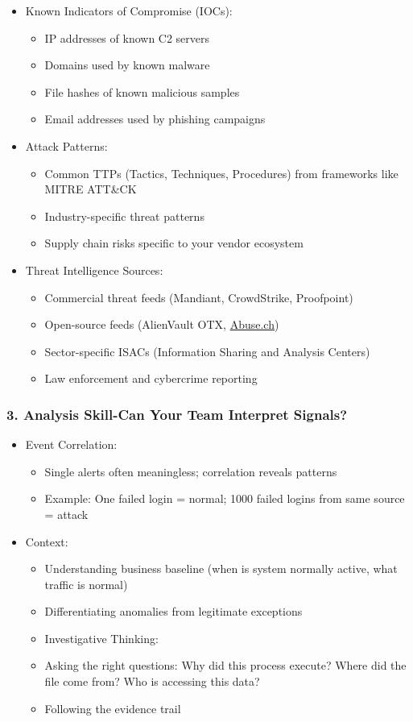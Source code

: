 \documentclass[10pt]{article}
\begin{document}
\begin{itemize}
  \item Known Indicators of Compromise (IOCs):
  \begin{itemize}
  	\item IP addresses of known C2 servers
  	\item Domains used by known malware
  	\item File hashes of known malicious samples
  	\item Email addresses used by phishing campaigns
  \end{itemize}
  \item Attack Patterns:
  \begin{itemize}
  	\item Common TTPs (Tactics, Techniques, Procedures) from frameworks like MITRE ATT\&CK
  	\item Industry-specific threat patterns
  	\item Supply chain risks specific to your vendor ecosystem
  \end{itemize}
  \item Threat Intelligence Sources:
  \begin{itemize}
  	\item Commercial threat feeds (Mandiant, CrowdStrike, Proofpoint)
  	\item Open-source feeds (AlienVault OTX, \href{http://Abuse.ch}{Abuse.ch})
  	\item Sector-specific ISACs (Information Sharing and Analysis Centers)
  	\item Law enforcement and cybercrime reporting
  \end{itemize}
\end{itemize}
\subsubsection*{3. Analysis Skill-Can Your Team Interpret Signals?}
\begin{itemize}
  \item Event Correlation:
  \begin{itemize}
  	\item Single alerts often meaningless; correlation reveals patterns
  	\item Example: One failed login = normal; 1000 failed logins from same source = attack
  \end{itemize}
  \item Context:
  \begin{itemize}
  	\item Understanding business baseline (when is system normally active, what traffic is normal)
  	\item Differentiating anomalies from legitimate exceptions
  	\item Investigative Thinking:
  	\item Asking the right questions: Why did this process execute? Where did the file come from? Who is accessing this data?
  	\item Following the evidence trail
  \end{itemize}
\end{itemize}
\end{document}
